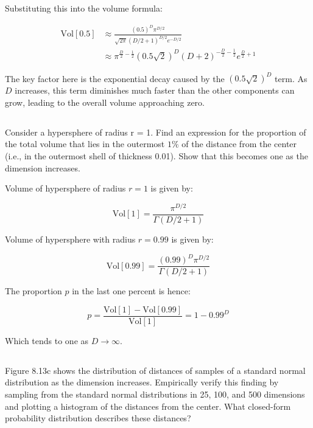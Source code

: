 \documentclass[12pt]{report}
\begin{document}
Substituting this into the volume formula:

\begin{align*}
    \text{Vol}[0.5] & \approx \frac{(0.5)^{D}\pi^{D/2}}{\sqrt{2\pi}(D/2 + 1)^{D/2}e^{-D/2}}                                   \\
                    & \approx \pi^{\frac{D}{2}-\frac{1}{2}}(0.5\sqrt{2})^{D}(D+2)^{-\frac{D}{2}-\frac{1}{2}}e^{\frac{D}{2}+1}
\end{align*}

The key factor here is the exponential decay caused by the $(0.5\sqrt{2})^{D}$ term. As $D$ increases, this term diminishes much faster than the other components can grow, leading to the overall volume approaching zero.

\subsection{}
\begin{mdframed}
    Consider a hypersphere of radius r = 1. Find an expression for the proportion of the total volume that lies in the outermost $1\%$ of the distance from the center (i.e., in the outermost shell of thickness 0.01). Show that this becomes one as the dimension increases.
\end{mdframed}

Volume of hypersphere of radius $r=1$ is given by:

\begin{equation*}
    \text{Vol}[1] = \frac{\pi^{D/2}}{\Gamma(D/2 + 1)}
\end{equation*}

Volume of hypersphere with radius $r=0.99$ is given by:

\begin{equation*}
    \text{Vol}[0.99] = \frac{(0.99)^{D}\pi^{D/2}}{\Gamma(D/2 + 1)}
\end{equation*}

The proportion $p$ in the last one percent is hence:

\begin{equation*}
    p = \frac{\text{Vol}[1] - \text{Vol}[0.99]}{\text{Vol}[1]} = 1 - 0.99^{D}
\end{equation*}

Which tends to one as $D \rightarrow \infty$.

\subsection{}
\begin{mdframed}
    Figure 8.13c shows the distribution of distances of samples of a standard normal distribution as the dimension increases. Empirically verify this finding by sampling from the standard normal distributions in 25, 100, and 500 dimensions and plotting a histogram of the distances from the center. What closed-form probability distribution describes these distances?
\end{mdframed}
\end{document}
